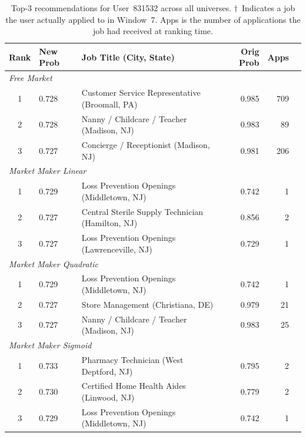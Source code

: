 \begin{table}[H]
    \centering
    \caption{Top-3 recommendations for User~831532 across all universes.
    $\dagger$~Indicates a job the user actually applied to in Window~7.
    Apps is the number of applications the job had received at ranking time.}
    \label{tab:sanity_831532}
    \begin{tabular}{@{}clp{5.5cm}rrr@{}}
        \toprule
        \textbf{Rank} & \textbf{New Prob} & \textbf{Job Title (City, State)} & \textbf{Orig Prob} & \textbf{Apps} \\
        \midrule
        \multicolumn{5}{l}{\textit{Free Market}} \\
        1 & 0.728 & Customer Service Representative (Broomall, PA) & 0.985 & 709 \\
        2 & 0.728 & Nanny / Childcare / Teacher (Madison, NJ)      & 0.983 &  89 \\
        3 & 0.727 & Concierge / Receptionist (Madison, NJ)         & 0.981 & 206 \\
        \midrule
        \multicolumn{5}{l}{\textit{Market Maker Linear}} \\
        1 & 0.729 & Loss Prevention Openings (Middletown, NJ)          & 0.742 & 1 \\
        2 & 0.727 & Central Sterile Supply Technician (Hamilton, NJ)   & 0.856 & 2 \\
        3 & 0.727 & Loss Prevention Openings (Lawrenceville, NJ)       & 0.729 & 1 \\
        \midrule
        \multicolumn{5}{l}{\textit{Market Maker Quadratic}} \\
        1 & 0.729 & Loss Prevention Openings (Middletown, NJ)          & 0.742 &  1 \\
        2 & 0.727 & Store Management (Christiana, DE)                  & 0.979 & 21 \\
        3 & 0.727 & Nanny / Childcare / Teacher (Madison, NJ)          & 0.983 & 25 \\
        \midrule
        \multicolumn{5}{l}{\textit{Market Maker Sigmoid}} \\
        1 & 0.733 & Pharmacy Technician (West Deptford, NJ)            & 0.795 & 2 \\
        2 & 0.730 & Certified Home Health Aides (Linwood, NJ)          & 0.779 & 2 \\
        3 & 0.729 & Loss Prevention Openings (Middletown, NJ)          & 0.742 & 1 \\
        \bottomrule
    \end{tabular}
\end{table}


